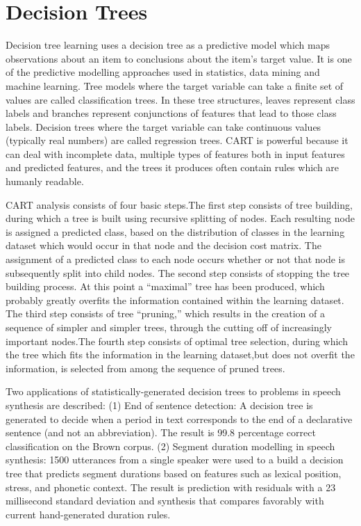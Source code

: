 \documentclass{acm_proc_article-sp}
\begin{document}
\section { Decision Trees }

Decision tree learning uses a decision tree as a predictive model which maps observations about an item to conclusions about the item's target value. It is one of the predictive modelling approaches used in statistics, data mining and machine learning. Tree models where the target variable can take a finite set of values are called classification trees. In these tree structures, leaves represent class labels and branches represent conjunctions of features that lead to those class labels. Decision trees where the target variable can take continuous values (typically real numbers) are called regression trees. CART is powerful because it can deal with incomplete data, multiple types of features  both in input features and predicted features, and the trees it produces often contain rules which are humanly readable.

 CART analysis consists of four basic steps.The first step consists of tree building, during which a tree is built using recursive splitting of nodes. Each resulting node is assigned a predicted class, based on the distribution of classes in the learning dataset which would occur in that node and the decision cost matrix. The assignment of a predicted class to each node occurs whether or not that node is subsequently split into child nodes. The second step consists of stopping the tree building process. At this point a “maximal” tree has been produced, which probably greatly overfits the information contained within the learning dataset.  The third step consists of tree “pruning,” which results in the creation of a sequence of simpler and simpler trees, through the cutting off of increasingly important nodes.The fourth step consists of optimal tree selection, during which the tree which fits the information in the learning dataset,but does not overfit the information, is selected from among the sequence of pruned trees.
   
 Two applications of statistically-generated decision trees to problems in speech synthesis are described: (1) End of sentence detection: A decision tree is generated to decide when a period in text corresponds to the end of a declarative sentence (and not an abbreviation). The result is 99.8 percentage correct classification on the Brown corpus. (2) Segment duration modelling in speech synthesis: 1500 utterances from a single speaker were used to a build a decision tree that predicts segment durations based on features such as lexical position, stress, and phonetic context. The result is prediction with residuals with a 23 millisecond standard deviation and synthesis that compares favorably with current hand-generated duration rules.
\end{document}
